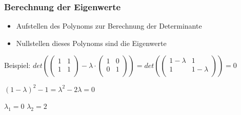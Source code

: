 \begin{frame}
    \frametitle{Berechnung der Eigenwerte}
    \begin{itemize}
        \item Aufstellen des Polynoms zur Berechnung der Determinante
        \item Nullstellen dieses Polynoms sind die Eigenwerte
    \end{itemize}
    Beispiel:
    $det(\begin{pmatrix}
        1 & 1 \\
        1 & 1 \\
    \end{pmatrix} - \lambda \cdot \begin{pmatrix}
        1 & 0 \\
        0 & 1 \\
    \end{pmatrix}) = det(\begin{pmatrix}
        1- \lambda & 1 \\
        1 & 1- \lambda \\
    \end{pmatrix}) = 0$

    $(1- \lambda)^2 - 1 = \lambda ^2 - 2 \lambda = 0 $
    \newline
    
    $\lambda _{1} = 0 $
    \newline
    $\lambda _{2} = 2$

\end{frame}

